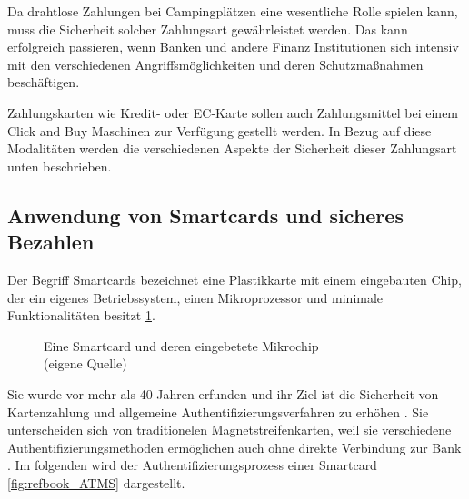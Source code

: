 Da drahtlose Zahlungen bei Campingplätzen eine wesentliche Rolle spielen kann, muss die Sicherheit 
solcher Zahlungsart gewährleistet werden. Das kann erfolgreich passieren, wenn Banken und andere Finanz
Institutionen sich intensiv mit den verschiedenen Angriffsmöglichkeiten und deren Schutzmaßnahmen 
beschäftigen.

Zahlungskarten wie Kredit- oder EC-Karte sollen auch Zahlungsmittel bei einem Click and Buy Maschinen
zur Verfügung gestellt werden. In Bezug auf diese Modalitäten werden die verschiedenen Aspekte der 
Sicherheit dieser Zahlungsart unten beschrieben.


\subsection{Anwendung von Smartcards und sicheres Bezahlen}
Der Begriff Smartcards bezeichnet eine Plastikkarte mit einem eingebauten Chip, der ein eigenes 
Betriebssystem, einen Mikroprozessor und minimale Funktionalitäten besitzt \ref{fig:eigenes_Bild}. 

\vfill
\begin{figure}[htb]
   \caption{Eine Smartcard und deren eingebetete Mikrochip\\(eigene Quelle)}
   \label{fig:eigenes_Bild}
\end{figure}
\vfill

Sie wurde vor mehr als 40 Jahren erfunden und ihr Ziel ist die Sicherheit von Kartenzahlung und allgemeine
Authentifizierungsverfahren zu erhöhen \cite{refip:JFSB}. Sie unterscheiden sich von traditionelen 
Magnetstreifenkarten, weil sie verschiedene Authentifizierungsmethoden ermöglichen auch ohne direkte 
Verbindung zur Bank \cite{refbook:ATMS}. Im folgenden wird der Authentifizierungsprozess einer Smartcard 
\ref{fig:refbook_ATMS} dargestellt. 


